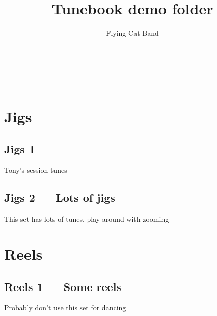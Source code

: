 \documentclass[a4paper,11pt]{article}
\begin{document}
\title{Tunebook demo folder}
\author{Flying Cat Band}

\makeatletter
\begin{titlepage}
    \begin{center}
        {\huge \bfseries  \@title }\\[2ex]
        {\LARGE  \@author}\\[50ex]
    \end{center}
\end{titlepage}
\makeatother
\thispagestyle{empty}
\newpage

\maketitle
\tableofcontents
\clearpage

\setcounter{page}{1} %

\section{Jigs}

\subsection{Jigs 1}
Tony's session tunes
\clearpage

\subsection{Jigs 2 --- Lots of jigs}
This set has lots of tunes, play around with zooming
\clearpage

\section{Reels}
\subsection{Reels 1 --- Some reels}
Probably don't use this set for dancing
\end{document}
